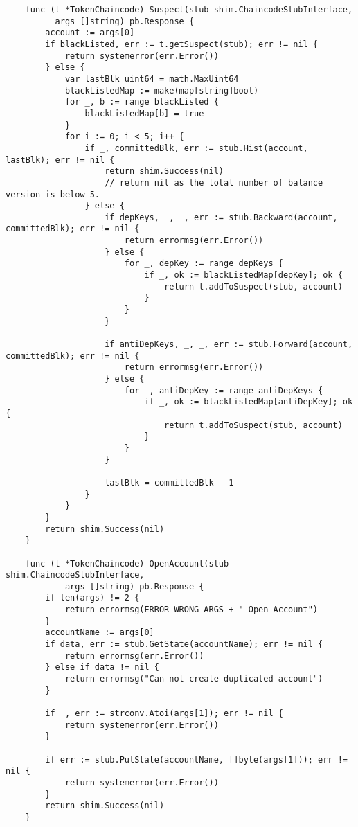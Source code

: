 \begin{lstlisting}
    func (t *TokenChaincode) Suspect(stub shim.ChaincodeStubInterface, 
          args []string) pb.Response {
        account := args[0]
        if blackListed, err := t.getSuspect(stub); err != nil {
            return systemerror(err.Error())
        } else {
            var lastBlk uint64 = math.MaxUint64
            blackListedMap := make(map[string]bool)
            for _, b := range blackListed {
                blackListedMap[b] = true
            }
            for i := 0; i < 5; i++ {
                if _, committedBlk, err := stub.Hist(account, lastBlk); err != nil {
                    return shim.Success(nil) 
                    // return nil as the total number of balance version is below 5.
                } else {
                    if depKeys, _, _, err := stub.Backward(account, committedBlk); err != nil {
                        return errormsg(err.Error())
                    } else {
                        for _, depKey := range depKeys {
                            if _, ok := blackListedMap[depKey]; ok {
                                return t.addToSuspect(stub, account)
                            }
                        }
                    }
    
                    if antiDepKeys, _, _, err := stub.Forward(account, committedBlk); err != nil {
                        return errormsg(err.Error())
                    } else {
                        for _, antiDepKey := range antiDepKeys {
                            if _, ok := blackListedMap[antiDepKey]; ok {
                                return t.addToSuspect(stub, account)
                            }
                        }
                    }
    
                    lastBlk = committedBlk - 1
                }
            }
        }
        return shim.Success(nil)
    }
    
    func (t *TokenChaincode) OpenAccount(stub shim.ChaincodeStubInterface, 
            args []string) pb.Response {
        if len(args) != 2 { 
            return errormsg(ERROR_WRONG_ARGS + " Open Account")
        }
        accountName := args[0]
        if data, err := stub.GetState(accountName); err != nil {
            return errormsg(err.Error())
        } else if data != nil {
            return errormsg("Can not create duplicated account")
        }
    
        if _, err := strconv.Atoi(args[1]); err != nil {
            return systemerror(err.Error())
        }
    
        if err := stub.PutState(accountName, []byte(args[1])); err != nil {
            return systemerror(err.Error())
        }
        return shim.Success(nil)
    }
    

\end{lstlisting}
